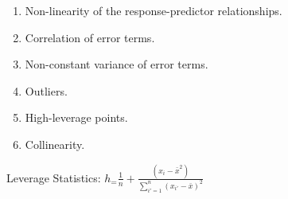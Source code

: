 \documentclass[
]{article}
\begin{document}
\begin{enumerate}
\def\labelenumi{\arabic{enumi}.}
\item
  Non-linearity of the response-predictor relationships.
\item
  Correlation of error terms.
\item
  Non-constant variance of error terms.
\item
  Outliers.
\item
  High-leverage points.
\item
  Collinearity.
\end{enumerate}

Leverage Statistics:
\(h_=\frac{1}{n} +\frac{(x_i-\bar{x}^2)}{\sum_{i'=1}^n(x_{i'}-\bar{x})^2}\)
\end{document}
